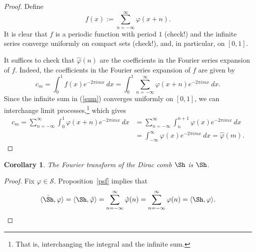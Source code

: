 \documentclass[12pt, letterpaper]{article}
\theoremstyle{plain}
\newtheorem{corollary}[theorem]{Corollary}
\renewcommand{\phi}{\varphi}
\begin{document}
\begin{proof}
    Define 
    \begin{equation}\label{sum}
        f(x) := \sum_{n = -\infty}^\infty \phi(x + n).
    \end{equation}
    It is clear that $f$ is a periodic function with period $1$ (check!) and the infinite series converge uniformly on compact sets (check!), and, in particular, on $[0, 1]$. 
    
    It suffices to check that $\hat{\phi}(n)$ are the coefficients in the Fourier series expansion of $f$. Indeed, the coefficients in the Fourier series expansion of $f$ are given by
    \begin{equation}
        c_m = \int_0^1 f(x) e^{-2\pi imx} \ dx = \int_0^1 \sum_{n = -\infty}^\infty \phi(x + n) e^{-2\pi imx} \ dx.
    \end{equation}
    Since the infinite sum in (\ref{sum}) converges uniformly on $[0,1]$, we can interchange limit processes,\footnote{That is, interchanging the integral and the infinite sum.} which gives
    \begin{align}
        c_m = \sum_{n = -\infty}^\infty \int_0^1 \phi(x + n) e^{-2\pi imx} \ dx & = \sum_{n = -\infty}^\infty \int_{n}^{n+1} \phi(x) e^{-2\pi imx} \ dx \\
        & = \int_{-\infty}^\infty \phi(x) e^{-2\pi imx} \ dx = \hat{\phi}(m).
    \end{align}
\end{proof}

\begin{corollary}
    The Fourier transform of the Dirac comb $\Sh$ is $\Sh$.
\end{corollary}

\begin{proof}
    Fix $\phi \in \mathcal{S}$. Proposition~\ref{psf} implies that
    \begin{equation}
        \langle \hat{\Sh}, \phi \rangle = \langle \Sh, \hat{\phi} \rangle = \sum_{n = -\infty}^\infty \hat{\phi}(n) = \sum_{n = -\infty}^\infty \phi(n) = \langle \Sh, \phi \rangle.
    \end{equation}
\end{proof}

\printbibliography
\end{document}
